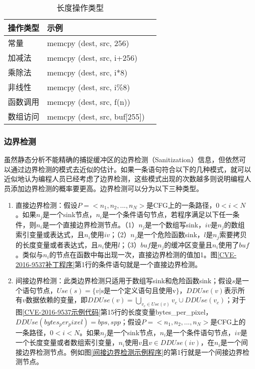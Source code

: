{\begin{table}[ht]
\begin{center}
\caption{长度操作类型} \label{LENGTH_TYPE}
\begin{small}
\begin{tabular}{lll}
\hline
{\bf 操作类型 } & {\bf 示例}\\ \hline
常量 & memcpy (dest, src, 256) \\ \hline
加减法 & memcpy (dest, src, i+256) \\ \hline
乘除法 & memcpy (dest, src, i*8) \\ \hline
非线性 & memcpy (dest, src, i\%8) \\ \hline
函数调用 & memcpy (dest, src, f(n)) \\ \hline
数组访问 & memcpy (dest, src, buf[255]) \\ \hline
\end{tabular}
\end{small}
\end{center}
\end{table}

\subsubsection{边界检测}

虽然静态分析不能精确的捕捉缓冲区的边界检测（Sanitization）信息，但依然可以通过边界检测的模式去近似的估计。如果一条语句符合以下的几种模式，就可以近似地认为编程人员已经考虑了边界检测，这些模式出现的次数越多则说明编程人员添加边界检测的概率要更高。边界检测可以分为以下三种类型。

\begin{enumerate}[1]
\item 直接边界检测：假设$P=<n_1, n_2,...,n_N>$是CFG上的一条路径，$0<i<N$。如果$n_j$是一个sink节点，$n_i$是一个条件语句节点，若程序满足以下任一条件，则$n_i$是一个直接边界检测节点。（1）$n_j$是一个数组写sink，$iv$是$n_j$的数组索引变量或表达式，且$n_i$使用$iv$；（2）$n_j$是一个危险函数sink，$l$是$n_j$索要拷贝的长度变量或者表达式，且$n_i$使用$l$；（3）$buf$是$n_j$的缓冲区变量且$n_i$使用了$buf$。类似与$n_i$的节点在函数中每出现一次，直接边界检测的值加1。图\ref{CVE-2016-9537补丁程序}第1行的条件语句就是一个直接边界检测。

\item 间接边界检测：此类边界检测只适用于数组写sink和危险函数sink；假设$s$是一个语句节点，$Use(s)=\{v|\text{s是一个定义语句且使用v}\}$，$DDUse(v)$表示所有$v$数据依赖的变量，即$DDUse(v) = \bigcup_{v_c \in Use(v)} v_c \cup DDUse(v_c)$；对于图\ref{CVE-2016-9537示例代码}第15行的长度变量{bytes\_per\_pixel}，$DDUse(bytes_per_pixel) = {bps, spp}$；假设$P=<n_1, n_2,...,n_N>$是CFG上的一条路径，$0<i<N$。如果$n_j$是一个sink节点，$n_i$是一个条件语句节点，$iv$是一个长度变量或者数组索引变量，$n_i$使用$v$且$v \in DDUse(iv)$，在$n_i$是一个间接边界检测节点。例如图\ref{间接边界检测示例程序}的第1行就是一个间接边界检测节点。


\end{enumerate}}
